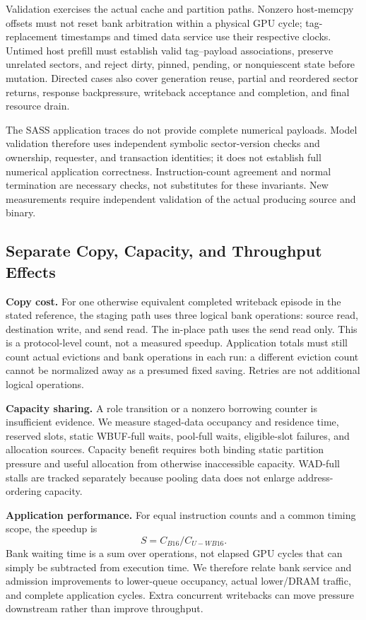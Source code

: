 \documentclass[conference,letterpaper]{IEEEtran}
\newcommand{\base}{B16}
\newcommand{\unif}{U-WB16}
\begin{document}
Validation exercises the actual cache and partition paths. Nonzero host-memcpy offsets must not reset bank arbitration within a physical GPU cycle; tag-replacement timestamps and timed data service use their respective clocks. Untimed host prefill must establish valid tag--payload associations, preserve unrelated sectors, and reject dirty, pinned, pending, or nonquiescent state before mutation. Directed cases also cover generation reuse, partial and reordered sector returns, response backpressure, writeback acceptance and completion, and final resource drain.

The SASS application traces do not provide complete numerical payloads. Model validation therefore uses independent symbolic sector-version checks and ownership, requester, and transaction identities; it does not establish full numerical application correctness. Instruction-count agreement and normal termination are necessary checks, not substitutes for these invariants. New measurements require independent validation of the actual producing source and binary.

\subsection{Separate Copy, Capacity, and Throughput Effects}
\textbf{Copy cost.} For one otherwise equivalent completed writeback episode in the stated reference, the staging path uses three logical bank operations: source read, destination write, and send read. The in-place path uses the send read only. This is a protocol-level count, not a measured speedup. Application totals must still count actual evictions and bank operations in each run: a different eviction count cannot be normalized away as a presumed fixed saving. Retries are not additional logical operations.

\textbf{Capacity sharing.} A role transition or a nonzero borrowing counter is insufficient evidence. We measure staged-data occupancy and residence time, reserved slots, static WBUF-full waits, pool-full waits, eligible-slot failures, and allocation sources. Capacity benefit requires both binding static partition pressure and useful allocation from otherwise inaccessible capacity. WAD-full stalls are tracked separately because pooling data does not enlarge address-ordering capacity.

\textbf{Application performance.} For equal instruction counts and a common timing scope, the speedup is
\begin{equation}
 S=C_{\base}/C_{\unif}.
\end{equation}
Bank waiting time is a sum over operations, not elapsed GPU cycles that can simply be subtracted from execution time. We therefore relate bank service and admission improvements to lower-queue occupancy, actual lower/DRAM traffic, and complete application cycles. Extra concurrent writebacks can move pressure downstream rather than improve throughput.
\end{document}
